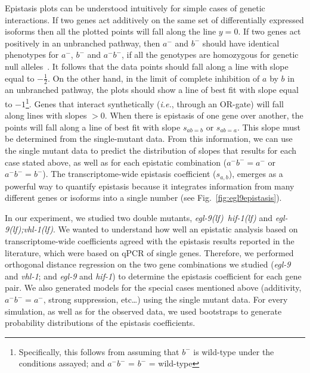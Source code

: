 \documentclass[10pt, onecolumn]{article}
\newcommand{\gene}[1]{\emph{#1}}
\newcommand{\eglvhl}{\emph{\mbox{egl-9(lf);vhl-1(lf)}}}
\newcommand{\eglhif}{\emph{\mbox{egl-9(lf)}~\mbox{hif-1(lf)}}}
\begin{document}
Epistasis plots can be understood intuitively for simple cases of genetic
interactions. If two genes act additively on the same set of differentially
expressed isoforms then all the plotted points will fall along the line $y=0$.
If two genes act positively in an unbranched pathway, then $a^-$ and $b^-$ should
have identical phenotypes for $a^-$, $b^-$ and $a^-b^-$, if all the genotypes are
homozygous for genetic null alleles~\cite{Huang2006}. It follows that the
data points should fall along a line with slope equal to $-\frac{1}{2}$. On the
other hand, in the limit of complete inhibition of $a$ by $b$ in an unbranched
pathway, the plots should show
a line of best fit with slope equal to $-1$\footnote{Specifically, this follows
from assuming that $b^-$ is wild-type under the conditions assayed; and
$a^-b^-$ = $b^-$ = wild-type}.
Genes that interact synthetically (\emph{i.e.}, through an OR-gate) will fall
along lines with slopes $>0$. When there is epistasis of one gene over another,
the points will fall along a line of best fit with slope $s_{ab=b}$ or $s_{ab=a}$.
This slope must be determined from the single-mutant data.
From this information, we can use the single mutant data to predict the
distribution of slopes that results for each case stated above, as well as for
each epistatic combination ($a^-b^-=a^-$ or $a^-b^-=b^-$). The transcriptome-wide
epistasis coefficient ($s_{a, b}$), emerges as a powerful way to quantify
epistasis because it integrates information from many different genes or isoforms
into a single number (see Fig.~\ref{fig:egl9epistasis}).

In our experiment, we studied two double mutants, \eglhif{} and \eglvhl{}.
We wanted to understand how well an epistatic analysis based on transcriptome-wide
coefficients agreed with the epistasis results reported in the literature, which
were based on qPCR of single genes. Therefore, we performed orthogonal distance
regression on the two gene combinations we studied (\gene{egl-9} and
\gene{vhl-1}; and \gene{egl-9} and \gene{hif-1}) to determine the epistasis
coefficient for each gene pair. We also generated models for the special cases
mentioned above (additivity, $a^-b^-=a^-$, strong suppression, etc\ldots) using
the single mutant data. For every simulation, as well as for the observed data,
we used bootstraps to generate probability distributions of the epistasis
coefficients.
\end{document}
